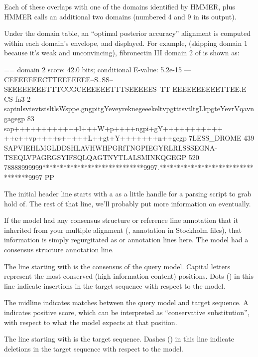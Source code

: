 Each of these overlaps with one of the domains identified by HMMER,
plus HMMER calls an additional two domains (numbered 4 and 9 in its
output).


Under the domain table, an ``optimal posterior accuracy'' alignment
\citep{Holmes98} is computed within each domain's envelope, and
displayed. For example, (skipping domain 1 because it's weak and
unconvincing), fibronectin III domain 2 of  is
shown as:

\begin{sreoutput}
 == domain 2    score: 42.0 bits;  conditional E-value: 5.2e-15
                  ---CEEEEEEECTTEEEEEEE--S..SS--SEEEEEEEETTTCCGCEEEEEETTTSEEEEES--TT-EEEEEEEEEETTEE.E CS
          fn3   2 saptnlsvtevtstsltlsWsppe.gngpitgYeveyreknegeeekeltvpgtttsvtltgLkpgteYevrVqavngagegp 83 
                  sap++++++++++++l+++W+p++++ngpi+gY+++++++++++ ++e++vp++++s+++++L++gt+Y+++++++n++gegp
  7LESS_DROME 439 SAPVIEHLMGLDDSHLAVHWHPGRfTNGPIEGYRLRLSSSEGNA-TSEQLVPAGRGSYIFSQLQAGTNYTLALSMINKQGEGP 520
                  78888999999*****************************9997.**********************************9997 PP
\end{sreoutput}

The initial header line starts with a \prog{==} as a little handle for
a parsing script to grab hold of. The rest of that line, we'll
probably put more information on eventually.

If the model had any consensus structure or reference line annotation
that it inherited from your multiple alignment (,
 annotation in Stockholm files), that information is
simply regurgitated as  or  annotation lines
here. The  model had a consensus structure annotation line.

The line starting with  is the consensus of the query
model. Capital letters represent the most conserved (high information
content) positions. Dots () in this line indicate insertions
in the target sequence with respect to the model.

The midline indicates matches between the query model and target
sequence. A \prog{+} indicates positive score, which can be
interpreted as ``conservative substitution'', with respect to what the
model expects at that position.

The line starting with  is the target sequence.
Dashes (\prog{-}) in this line indicate deletions in the target
sequence with respect to the model.

